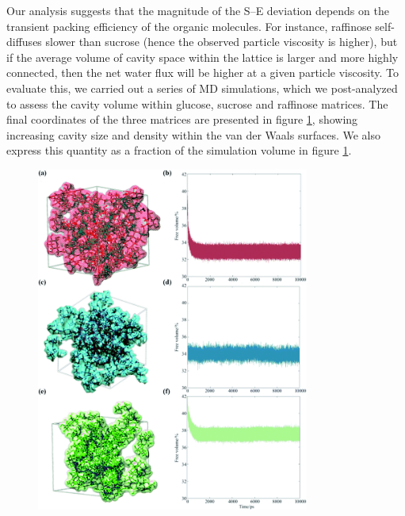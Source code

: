 Our analysis suggests that the magnitude of the S–E deviation depends on the transient packing efficiency of the organic molecules. For instance, raffinose self-diffuses slower than sucrose (hence the observed particle viscosity is higher), but if the average volume of cavity space within the lattice is larger and more highly connected, then the net water flux will be higher at a given particle viscosity. To evaluate this, we carried out a series of MD simulations, which we post-analyzed to assess the cavity volume within glucose, sucrose and raffinose matrices. The final coordinates of the three matrices are presented in figure \ref{fig:wat_packing_eff}, showing increasing cavity size and density within the van der Waals surfaces. We also express this quantity as a fraction of the simulation volume in figure \ref{fig:wat_packing_eff}.

\begin{figure}
    \centering
    \includegraphics[width=0.8\textwidth]{chapters/water_hopping/figures/f5.png}
    \label{fig:wat_packing_eff}
\end{figure}

